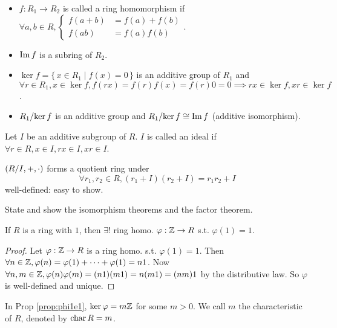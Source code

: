 \begin{definition} \mbox{}
  \begin{itemize}
    \item $f: R_1 \to R_2$ is called a ring homomorphism if
      $\forall a, b \in R, \begin{cases}
        f(a+b) &= f(a) + f(b) \\
        f(ab) &= f(a)f(b)
      \end{cases}$.
    \item $\operatorname{Im} f$ is a subring of $R_2$.
    \item $\ker f = \{\, x \in R_1 \mid f(x) = 0 \,\}$ is an additive group of
      $R_1$ and $\forall r \in R_1, x \in \ker f, f(rx) = f(r)f(x) = f(r)0 = 0
      \implies rx \in \ker f, xr \in \ker f$.
    \item ${R_1}/{\ker f}$ is an additive group and
      ${R_1}/{\ker f} \cong \operatorname{Im} f$ (additive isomorphism).
  \end{itemize}
\end{definition}

\begin{definition}
  Let $I$ be an additive subgroup of $R$.
  $I$ is called an ideal if $\forall r \in R, x \in I, rx \in I, xr \in I$.

  $\left({R}/{I}, +, \cdot \right)$ forms a quotient ring under
  \[ \forall r_1, r_2 \in R, (r_1+I)(r_2+I) = r_1r_2 + I \]
  well-defined: easy to show.
\end{definition}

\begin{exercise}
  State and show the isomorphism theorems and the factor theorem.
\end{exercise}

\begin{prop}
  If $R$ is a ring with $1$, then $\exists!$ ring homo. $\varphi: \mathbb{Z} \to R$
  s.t. $\varphi(1) = 1$.
  \begin{proof}
    Let $\varphi: \mathbb{Z} \to R$ is a ring homo. s.t. $\varphi(1) = 1$. Then
    $\forall n \in \mathbb{Z}, \varphi(n) = \varphi(1) + \dots + \varphi(1) = n1$.
    Now $\forall n, m \in \mathbb{Z}, \varphi(n)\varphi(m) = (n1)(m1) = n(m1) = (nm)1$
    by the distributive law. So $\varphi$ is well-defined and unique.
  \end{proof}
  \label{prop:phi1e1}
\end{prop}

\begin{definition}
  In Prop \ref{prop:phi1e1}, $\ker \varphi = m\mathbb{Z}$ for some $m > 0$.
  We call $m$ the characteristic of $R$, denoted by $\operatorname{char} R = m$.
\end{definition}

